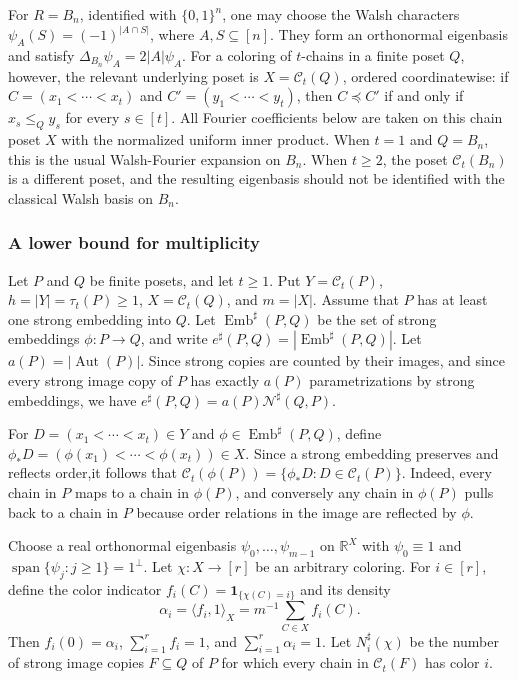 \documentclass[twoside,12pt]{article}
\begin{document}
For \(R=B_n\), identified with \(\{0,1\}^n\), one may choose the Walsh
characters \(\psi_A(S)=(-1)^{|A\cap S|}\), where \(A,S\subseteq[n]\).
They form an orthonormal eigenbasis and satisfy
\(\Delta_{B_n}\psi_A=2|A|\psi_A\). For a coloring of \(t\)-chains in a
finite poset \(Q\), however, the relevant underlying poset is
\(X=\mathcal C_t(Q)\), ordered coordinatewise: if
\(C=(x_1<\cdots<x_t)\) and \(C'=(y_1<\cdots<y_t)\), then
\(C\preceq C'\) if and only if \(x_s\le_Q y_s\) for every \(s\in[t]\).
All Fourier coefficients below are taken on this chain poset \(X\) with
the normalized uniform inner product. When \(t=1\) and \(Q=B_n\), this is
the usual Walsh-Fourier expansion on \(B_n\). When \(t\ge2\), the poset
\(\mathcal C_t(B_n)\) is a different poset, and the resulting eigenbasis
should not be identified with the classical Walsh basis on \(B_n\).

\subsubsection{A lower bound for multiplicity}

Let \(P\) and \(Q\) be finite posets, and let \(t\ge1\). Put
\(Y=\mathcal C_t(P)\), \(h=|Y|=\tau_t(P)\ge1\), \(X=\mathcal C_t(Q)\), and
\(m=|X|\). Assume that \(P\) has at least one strong embedding into \(Q\).
Let \(\operatorname{Emb}^{\sharp}(P,Q)\) be the set of strong embeddings
\(\phi:P\to Q\), and write \(e^\sharp(P,Q)=|\operatorname{Emb}^{\sharp}(P,Q)|\).
Let \(a(P)=|\operatorname{Aut}(P)|\). Since strong copies are counted by
their images, and since every strong image copy of \(P\) has exactly
\(a(P)\) parametrizations by strong embeddings, we have
\(e^\sharp(P,Q)=a(P)\mathcal N^\sharp(Q,P)\).

For \(D=(x_1<\cdots<x_t)\in Y\) and
\(\phi\in\operatorname{Emb}^{\sharp}(P,Q)\), define
\(\phi_*D=(\phi(x_1)<\cdots<\phi(x_t))\in X\). Since a strong embedding
preserves and reflects order,it follows that \(\mathcal C_t(\phi(P))=\{\phi_*D:D\in
\mathcal C_t(P)\}\). Indeed, every chain in \(P\) maps to a chain in
\(\phi(P)\), and conversely any chain in \(\phi(P)\) pulls back to a chain
in \(P\) because order relations in the image are reflected by \(\phi\).

Choose a real orthonormal eigenbasis \(\psi_0,\ldots,\psi_{m-1}\) on
\(\mathbb R^X\) with \(\psi_0\equiv1\) and
\(\operatorname{span}\{\psi_j:j\ge1\}=1^\perp\). Let
\(\chi:X\to[r]\) be an arbitrary coloring. For \(i\in[r]\), define the
color indicator \(f_i(C)=\mathbf1_{\{\chi(C)=i\}}\) and its density
$$\alpha_i=\langle f_i,1\rangle_X=m^{-1}\sum_{C\in X}f_i(C).$$ Then
\(\widehat f_i(0)=\alpha_i\), \(\sum_{i=1}^r f_i=1\), and
\(\sum_{i=1}^r\alpha_i=1\). Let \(N_i^\sharp(\chi)\) be the number of
strong image copies \(F\subseteq Q\) of \(P\) for which every chain in
\(\mathcal C_t(F)\) has color \(i\).
\end{document}

